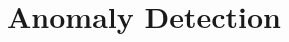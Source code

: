 \documentclass[../main.tex]{subfiles}
\begin{document}
    \section{Anomaly Detection}
        
        
        
        
        
\end{document}
